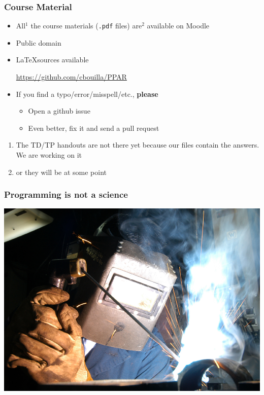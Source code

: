 \documentclass[10pt]{beamer}
\begin{document}
\begin{frame}
  \frametitle{Course Material}

  \begin{itemize}
  \item All${}^1$ the course materials (\texttt{.pdf} files) are${}^2$ available on Moodle
  \item Public domain
  \item \LaTeX sources available
    \begin{center}
      \url{https://github.com/cbouilla/PPAR}
    \end{center}

    \medskip

  \item If you find a typo/error/misspell/etc., \textbf{please}
    \begin{itemize}
    \item Open a github issue
    \item Even better, fix it and send a pull request
    \end{itemize}
  \end{itemize}

  \vfill

  \tiny
  \begin{enumerate}
  \item The TD/TP handouts are not there yet because our files contain the answers. We are working on it
  \item or they will be at some point
  \end{enumerate}
\end{frame}


\begin{frame}
  \frametitle{Programming is \textbf{not} a science}

  \centering
  \includegraphics[width=\textwidth]{welding.jpg}
\end{frame}
\end{document}
